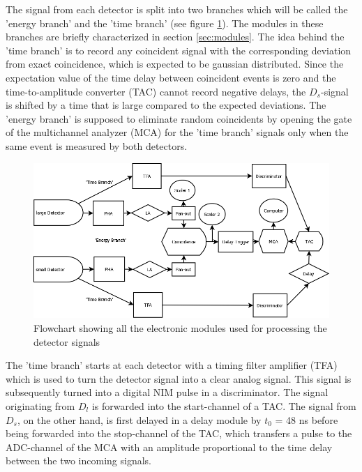\documentclass[a4paper,parskip,11pt, DIV12]{scrreprt}
\begin{document}
The signal from each detector is split into two branches which will be called the 'energy branch' and the 'time branch' (see figure \ref{fig:Electronics1}). The modules in these branches are briefly characterized in section \ref{sec:modules}. The idea behind the 'time branch' is to record any coincident signal with the corresponding deviation from exact coincidence, which is expected to be gaussian distributed. Since the expectation value of the time delay between coincident events is zero and the time-to-amplitude converter (TAC) cannot record negative delays, the $D_s$-signal is shifted by a time that is large compared to the expected deviations.  The 'energy branch' is supposed to eliminate random coincidents by opening the gate of the multichannel analyzer (MCA) for the 'time branch' signals only when the same event is measured by both detectors.
\begin{figure}[H]
\centering
\includegraphics[width=1\textwidth]{KT-Elektronik.png}
\caption[Electronics1]{Flowchart showing all the electronic modules used for processing the detector signals}
\label{fig:Electronics1}
		\end{figure}
The 'time branch' starts at each detector with a timing filter amplifier (TFA) which is used to turn the detector signal into a clear analog signal. This signal is subsequently turned into a digital NIM pulse in a discriminator. The signal originating from $D_l$ is forwarded into the start-channel of a TAC. The signal from $D_s$, on the other hand, is first delayed in a delay module by $t_0$ = 48 ns before being forwarded into the stop-channel of the TAC, which transfers a pulse to the ADC-channel of the MCA with an amplitude proportional to the time delay between the two incoming signals. 
\end{document}
